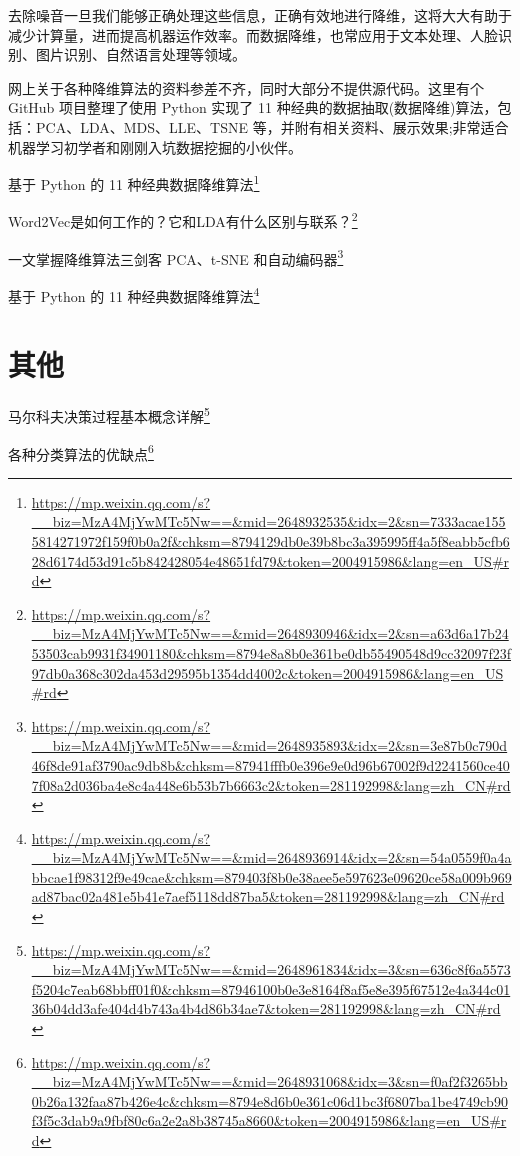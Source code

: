 \documentclass[]{ctexbook}
\renewcommand{\href}[2]{#2\footnote{\url{#1}}}
\begin{document}
去除噪音一旦我们能够正确处理这些信息，正确有效地进行降维，这将大大有助于减少计算量，进而提高机器运作效率。而数据降维，也常应用于文本处理、人脸识别、图片识别、自然语言处理等领域。

网上关于各种降维算法的资料参差不齐，同时大部分不提供源代码。这里有个 GitHub 项目整理了使用 Python 实现了 11 种经典的数据抽取(数据降维)算法，包括：PCA、LDA、MDS、LLE、TSNE 等，并附有相关资料、展示效果;非常适合机器学习初学者和刚刚入坑数据挖掘的小伙伴。

\href{https://mp.weixin.qq.com/s?__biz=MzA4MjYwMTc5Nw==\&mid=2648932535\&idx=2\&sn=7333acae1555814271972f159f0b0a2f\&chksm=8794129db0e39b8bc3a395995ff4a5f8eabb5cfb628d6174d53d91c5b842428054e48651fd79\&token=2004915986\&lang=en_US\#rd}{基于 Python 的 11 种经典数据降维算法}

\href{https://mp.weixin.qq.com/s?__biz=MzA4MjYwMTc5Nw==\&mid=2648930946\&idx=2\&sn=a63d6a17b2453503cab9931f34901180\&chksm=8794e8a8b0e361be0db55490548d9cc32097f23f97db0a368c302da453d29595b1354dd4002c\&token=2004915986\&lang=en_US\#rd}{Word2Vec是如何工作的？它和LDA有什么区别与联系？}

\href{https://mp.weixin.qq.com/s?__biz=MzA4MjYwMTc5Nw==\&mid=2648935893\&idx=2\&sn=3e87b0c790d46f8de91af3790ac9db8b\&chksm=87941fffb0e396e9e0d96b67002f9d2241560ce407f08a2d036ba4e8c4a448e6b53b7b6663c2\&token=281192998\&lang=zh_CN\#rd}{一文掌握降维算法三剑客 PCA、t-SNE 和自动编码器}

\href{https://mp.weixin.qq.com/s?__biz=MzA4MjYwMTc5Nw==\&mid=2648936914\&idx=2\&sn=54a0559f0a4abbcae1f98312f9e49cae\&chksm=879403f8b0e38aee5e597623e09620ce58a009b969ad87bac02a481e5b41e7aef5118dd87ba5\&token=281192998\&lang=zh_CN\#rd}{基于 Python 的 11 种经典数据降维算法}

\hypertarget{ux5176ux4ed6-1}{%
\section{其他}\label{ux5176ux4ed6-1}}

\href{https://mp.weixin.qq.com/s?__biz=MzA4MjYwMTc5Nw==\&mid=2648961834\&idx=3\&sn=636c8f6a5573f5204c7eab68bbff01f0\&chksm=87946100b0e3e8164f8af5e8e395f67512e4a344c0136b04dd3afe404d4b743a4b4d86b34ae7\&token=281192998\&lang=zh_CN\#rd}{马尔科夫决策过程基本概念详解}

\href{https://mp.weixin.qq.com/s?__biz=MzA4MjYwMTc5Nw==\&mid=2648931068\&idx=3\&sn=f0af2f3265bb0b26a132faa87b426e4c\&chksm=8794e8d6b0e361c06d1bc3f6807ba1be4749cb90f3f5c3dab9a9fbf80c6a2e2a8b38745a8660\&token=2004915986\&lang=en_US\#rd}{各种分类算法的优缺点}
\end{document}
